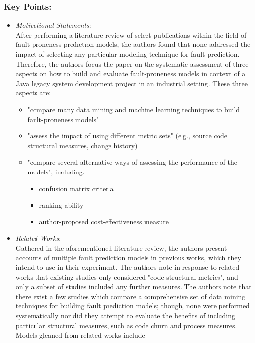 \documentclass{sig-alternate-05-2015}
\begin{document}
\subsubsection{Key Points:}
\begin{itemize}
\item \emph{Motivational Statements}: \\
After performing a literature review of select publications within the field of fault-proneness prediction models, the authors found that none addressed the impact of selecting any particular modeling technique for fault prediction. Therefore, the authors focus the paper on the systematic assessment of three aspects on how to build and evaluate fault-proneness models in context of a Java legacy system development project in an industrial setting. These three aspects are:
	\begin{itemize}
	\item "compare many data mining and machine learning techniques to build fault-proneness models"
	\item "assess the impact of using different metric sets" (e.g., source code structural measures, change history)
	\item "compare several alternative ways of assessing the performance of the models", including:
		\begin{itemize}
		\item confusion matrix criteria
		\item ranking ability
		\item author-proposed cost-effectiveness measure
		\end{itemize}
	\end{itemize}
\item \emph{ Related Works}: \\
Gathered in the aforementioned literature review, the authors present accounts of multiple fault prediction models in previous works, which they intend to use in their experiment. The authors note in response to related works that existing studies only considered "code structural metrics", and only a subset of studies included any further measures. The authors note that there exist a few studies which compare a comprehensive set of data mining techniques for building fault prediction models; though, none were performed systematically nor did they attempt to evaluate the benefits of including particular structural measures, such as code churn and process measures. Models gleaned from related works include:
	\begin{itemize}

\end{itemize}
\end{itemize}
\end{document}
